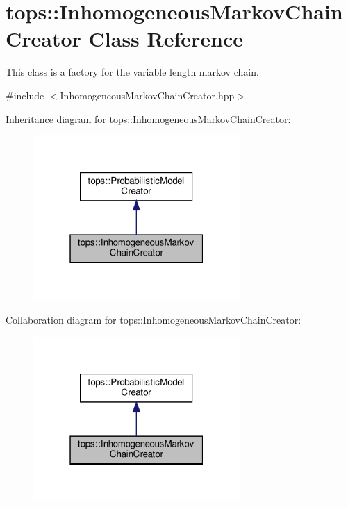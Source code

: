 \hypertarget{classtops_1_1InhomogeneousMarkovChainCreator}{}\section{tops\+:\+:Inhomogeneous\+Markov\+Chain\+Creator Class Reference}
\label{classtops_1_1InhomogeneousMarkovChainCreator}


This class is a factory for the variable length markov chain.  




{\ttfamily \#include $<$Inhomogeneous\+Markov\+Chain\+Creator.\+hpp$>$}



Inheritance diagram for tops\+:\+:Inhomogeneous\+Markov\+Chain\+Creator\+:
\nopagebreak
\begin{figure}[H]
\begin{center}
\leavevmode
\includegraphics[width=223pt]{classtops_1_1InhomogeneousMarkovChainCreator__inherit__graph}
\end{center}
\end{figure}


Collaboration diagram for tops\+:\+:Inhomogeneous\+Markov\+Chain\+Creator\+:
\nopagebreak
\begin{figure}[H]
\begin{center}
\leavevmode
\includegraphics[width=223pt]{classtops_1_1InhomogeneousMarkovChainCreator__coll__graph}
\end{center}
\end{figure}
